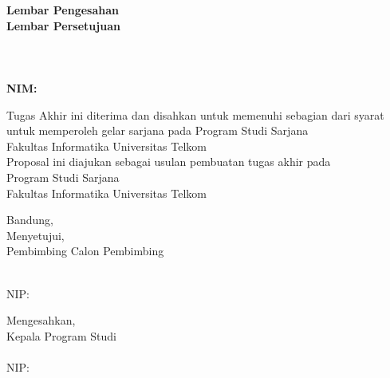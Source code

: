 {\centering
\iflogTA
\textbf{\large Lembar Pengesahan}\\  %
\else
\textbf{\large Lembar Persetujuan}\\
\fi
\vspace{0.5cm}
\textbf{\Title}\\
\vspace{0.5cm}
\textbf{\textit{\EngTitle}}\\
\vspace{0.5cm}
\textbf{\Author}\\
\textbf{NIM: \NIM}\\
\vspace{1cm}

\iflogTA 
{ Tugas Akhir ini diterima dan disahkan untuk memenuhi sebagian dari syarat untuk memperoleh gelar sarjana pada Program Studi Sarjana \Prodi\\ Fakultas Informatika Universitas Telkom}\\  %
\else
{ Proposal ini diajukan sebagai usulan pembuatan tugas akhir pada\\ Program Studi Sarjana \Prodi\\ Fakultas Informatika Universitas Telkom}\\
\fi
\vspace{0.5cm}

{Bandung, \Tanggal\quad \Bulan \quad \Date}\\
\vspace{0.5cm}
Menyetujui,\\
\iflogTA
Pembimbing
\else
Calon Pembimbing
\fi
\begin{center}
\vspace{2cm}
\underline{\PembimbingSatu} \\ 
NIP: \NIPPembimbingSatu
\end{center}
\vspace{0.5cm}
\iflogTA
Mengesahkan,\\   %
Kepala Program Studi \Prodi\\ %
\vspace{2.5cm}   %
\underline{\Kaprodi}\\ NIP: \NIPKaprodi\\  %
\fi
}